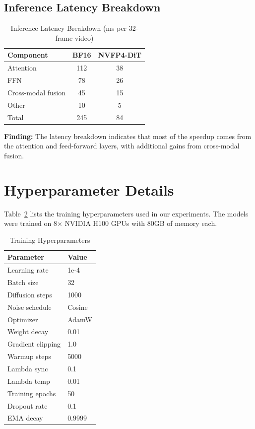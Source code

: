 \documentclass[journal,twoside]{IEEEtran}
\theoremstyle{definition}
\theoremstyle{remark}
\begin{document}
\subsection{Inference Latency Breakdown}

\begin{table}[H]
\centering
\caption{Inference Latency Breakdown (ms per 32-frame video)}
\label{tab:latency_breakdown}
\begin{tabular}{lcc}
\toprule
Component & BF16 & NVFP4-DiT \\
\midrule
Attention & 112 & 38 \\
FFN & 78 & 26 \\
Cross-modal fusion & 45 & 15 \\
Other & 10 & 5 \\
\midrule
Total & 245 & 84 \\
\bottomrule
\end{tabular}
\end{table}

\textbf{Finding:} The latency breakdown indicates that most of the speedup comes from the attention and feed-forward layers, with additional gains from cross-modal fusion.

\FloatBarrier
\section{Hyperparameter Details}
\label{app:e}

Table~\ref{tab:hyperparams} lists the training hyperparameters used in our experiments. The models were trained on 8$\times$ NVIDIA H100 GPUs with 80GB of memory each.

\begin{table}[H]
\centering
\caption{Training Hyperparameters}
\label{tab:hyperparams}
\begin{tabular}{ll}
\toprule
Parameter & Value \\
\midrule
Learning rate & 1e-4 \\
Batch size & 32 \\
Diffusion steps & 1000 \\
Noise schedule & Cosine \\
Optimizer & AdamW \\
Weight decay & 0.01 \\
Gradient clipping & 1.0 \\
Warmup steps & 5000 \\
Lambda sync & 0.1 \\
Lambda temp & 0.01 \\
Training epochs & 50 \\
Dropout rate & 0.1 \\
EMA decay & 0.9999 \\
\bottomrule
\end{tabular}
\end{table}
\end{document}
